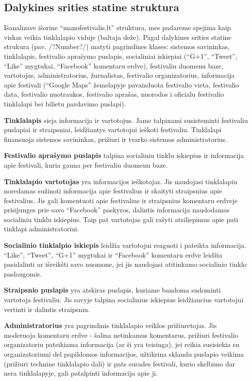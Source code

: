 ﻿\documentclass{VUMIFPSkursinis}
\begin{document}
{\subsection {Dalykines srities statine struktura}
Išanalizave išorine “manofestivalis.lt” struktura, mes padareme spejima kaip viskas veikia tinklalapio viduje (baltaja deže).
Pagal dalykines srities statine strukura (pav. /?Number?/) matyti pagrindines klases: sistemos savininkas, tinklalapis, festivalio aprašymo puslapis,
 socialiniai iskiepiai (“G+1”, “Tweet”, “Like” mygtukai, “Facebook” komentaru erdve), festivaliu duomenu baze, vartotojas, administratorius, žurnalistas, festivalio organizatorius,
 informacija apie festivali (“Google Maps” žemelapyje pavaizduota festivalio vieta, festivalio data, festivalio nuotraukos, festivalio aprašas, nuorodos i oficialu festivalio tinklalapi bei bilietu pardavimo puslapi). 

\textbf{Tinklalapis} sieja informacija ir vartotojus. Jame talpinami susisteminti festivaliu puslapiai ir straipsniai, leidžiantys vartotojui ieškoti festivaliu. Tinklalapi finansuoja sistemos savininkas, prižiuri ir tvarko sistemos administratorius.

\textbf{Festivalio aprašymo puslapis} talpina socialiniu tinklu iskiepius ir informacija apie festivali, kuria gauna per festivaliu duomenu baze.  

\textbf{Tinklalapio vartotojas} yra informacijos ieškotojas. Jis naudojasi tinklalapiu noredamas sužinoti informacija apie festivalius ir skaityti straipsnius apie festivalius. Jis gali komentuoti apie festivalius ir straipsnius komentaru erdveje prisijunges prie savo “Facebook” paskyros, dalintis informacija naudodamas socialiniu tinklu iskiepius. Taip pat vartotojas gali rašyti atsiliepimus apie pati tinklapi administratoriui.

\textbf{Socialinio tinklalpio iskiepis} leidžia vartotojui reaguoti i pateikta informacija. “Like”, “Tweet”, “G+1” mygtukai  ir “Facebook” komentaru erdve leidžia pasidalinti ar išreikšti savo nuomone, jei jis naudojasi atitinkamo socialinio tinklo paslaugomis.

\textbf{Straipsnio puslapis} yra atskiras puslapis, kuriame bandoma sudominti vartotoja festivaliu. Jis savyje talpina socialinius iskiepius leidžiancius vartotojui vertinti ir dalintis straipsniu.

\textbf{Administratorius} yra pagrindinis tinklalapio veiklos prižiuretojas.
Jis moderuoja komentaru erdve - šalina netinkamus komentarus, prižiuri festivalio organizatoriu pateikiama informacija (ar ši yra teisinga), jei reikia susisiekia su organizatoriumi del papildomos informacijos, užtikrina sklandu puslapio veikima (prižiuri technine tinklalapio dali) ir pats surades festivali, kurio skelbimo dar nera tinklalapyje, gali patalpinti informacija apie ji.

}
\end{document}
